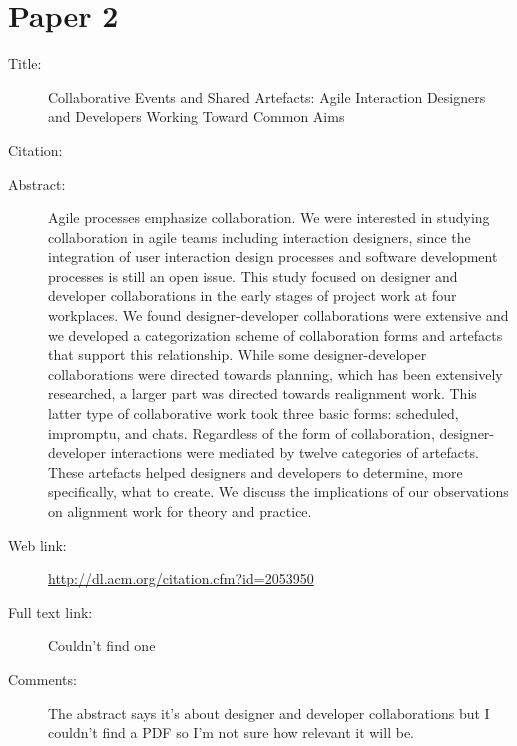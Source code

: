 \documentclass{scrartcl}
\begin{document}
\section*{Paper 2}
\begin{description}
\item[Title:] Collaborative Events and Shared Artefacts: Agile Interaction Designers and Developers Working Toward Common Aims
\item[Citation:] \cite{Brown}
\item[Abstract:] Agile processes emphasize collaboration. We were interested in studying collaboration in agile teams including interaction designers, since the integration of user interaction design processes and software development processes is still an open issue. This study focused on designer and developer collaborations in the early stages of project work at four workplaces. We found designer-developer collaborations were extensive and we developed a categorization scheme of collaboration forms and artefacts that support this relationship. While some designer-developer collaborations were directed towards planning, which has been extensively researched, a larger part was directed towards realignment work. This latter type of collaborative work took three basic forms: scheduled, impromptu, and chats. Regardless of the form of collaboration, designer-developer interactions were mediated by twelve categories of artefacts. These artefacts helped designers and developers to determine, more specifically, what to create. We discuss the implications of our observations on alignment work for theory and practice.
\item[Web link:] \url{http://dl.acm.org/citation.cfm?id=2053950}
\item[Full text link:] Couldn't find one
\item[Comments:] The abstract says it's about designer and developer collaborations but I couldn't find a PDF so I'm not sure how relevant it will be. 
\end{description}
\end{document}
